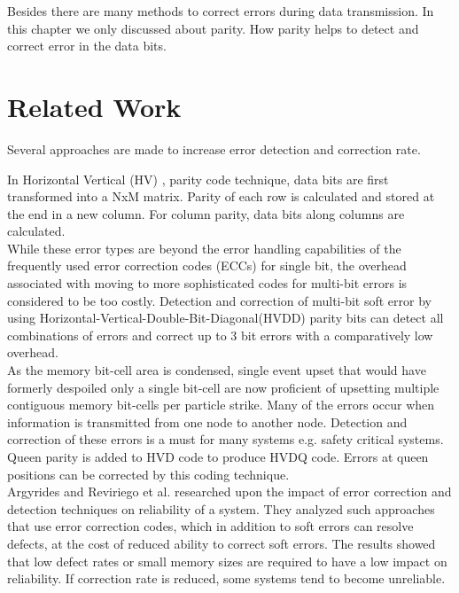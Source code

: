 \documentclass[12pt,a4paper]{report}
\begin{document}
 Besides there are many methods to correct errors during data transmission. In this chapter we
 only discussed about parity. How parity helps to detect and correct error in the data bits.
 
 \section{Related Work}
Several approaches are made to increase error detection and correction rate.

In Horizontal Vertical (HV) \cite{Dubrova},\cite{KorenKrishna} parity code technique, data bits are first transformed into a NxM matrix. Parity of each row is calculated and stored at the end in a new column. For column parity, data bits along columns are calculated.\\

While these error types are beyond the error handling capabilities of the frequently used error correction codes (ECCs) for single bit, the overhead associated with moving to more sophisticated codes for multi-bit errors is considered to be too costly. Detection and correction of multi-bit soft error by using Horizontal-Vertical-Double-Bit-Diagonal(HVDD) \cite{RahmanSadiAhammedJurjens} parity bits can detect all combinations of errors and correct up to 3 bit errors with a comparatively low overhead.\\

As the memory bit-cell area is condensed, single event upset that would have formerly despoiled only a single bit-cell are now proficient of upsetting multiple contiguous memory bit-cells per particle strike. Many of the errors occur when information is transmitted from one node to another node. Detection and correction of these errors is a must for many systems e.g. safety critical systems. Queen parity is added to HVD code to produce HVDQ \cite{RahmanAhammed} code. Errors at queen positions can be corrected by this coding technique.\\

Argyrides and Reviriego et al. \cite{ArgyridesReviriegoMaestro} researched upon the impact of error correction and detection techniques on reliability of a system. They analyzed such approaches that use error correction codes, which in addition to soft errors can resolve defects, at the cost of reduced ability to correct soft errors. The results showed that low defect rates or small memory sizes are required to have a low impact on reliability. If correction rate is reduced, some systems tend to become unreliable.\\
\end{document}
